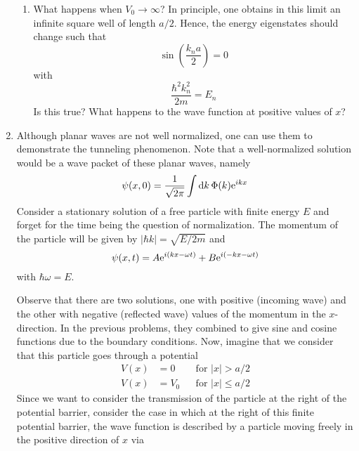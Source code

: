 \documentclass[../psets.tex]{subfiles}
\begin{document}
\begin{enumerate}
\begin{enumerate}
        \item What happens when $V_0\to\infty$? In principle, one obtains in this limit an infinite square well of length $a/2$. Hence, the energy eigenstates should change such that
        \begin{equation}
            \sin(\frac{k_na}{2}) = 0
        \end{equation}
        with
        \begin{equation}
            \frac{\hbar^2k_n^2}{2m} = E_n
        \end{equation}
        Is this true? What happens to the wave function at positive values of $x$?
    \end{enumerate}
    \item Although planar waves are not well normalized, one can use them to demonstrate the tunneling phenomenon. Note that a well-normalized solution would be a wave packet of these planar waves, namely
    \begin{equation}
        \psi(x,0) = \frac{1}{\sqrt{2\pi}}\int\dd{k}\Phi(k)\e[ikx]
    \end{equation}
    Consider a stationary solution of a free particle with finite energy $E$ and forget for the time being the question of normalization. The momentum of the particle will be given by $|\hbar k|=\sqrt{E/2m}$ and
    \begin{equation}\label{eqn:PS2E10}
        \psi(x,t) = A\e[i(kx-\omega t)]+B\e[i(-kx-\omega t)]
    \end{equation}
    with $\hbar\omega=E$.\par
    Observe that there are two solutions, one with positive (incoming wave) and the other with negative (reflected wave) values of the momentum in the $x$-direction. In the previous problems, they combined to give sine and cosine functions due to the boundary conditions. Now, imagine that we consider that this particle goes through a potential
    \begin{equation}
        \begin{aligned}
            V(x) &= 0   && \text{for }|x|>a/2\\
            V(x) &= V_0 && \text{for }|x|\leq a/2
        \end{aligned}
    \end{equation}
    Since we want to consider the transmission of the particle at the right of the potential barrier, consider the case in which at the right of this finite potential barrier, the wave function is described by a particle moving freely in the positive direction of $x$ via

\end{enumerate}
\end{document}
